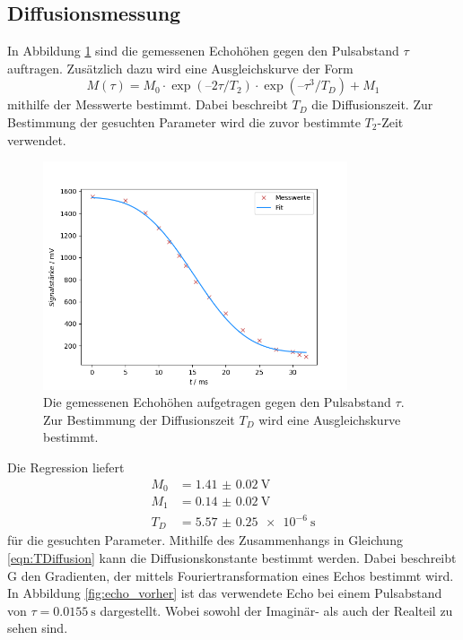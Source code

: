 \subsection{Diffusionsmessung}
In Abbildung \ref{fig:diff_fit} sind die gemessenen Echohöhen gegen den Pulsabstand $\tau$ auftragen.
Zusätzlich dazu wird eine Ausgleichskurve der Form
\begin{equation}
  M(\tau) = M_0 \cdot \exp(–2\tau/T_2)\cdot \exp(–\tau^3/T_D) + M_1 
\end{equation}
mithilfe der Messwerte bestimmt. Dabei beschreibt $T_D$ die Diffusionszeit. Zur Bestimmung der gesuchten Parameter wird 
die zuvor bestimmte $T_2$-Zeit verwendet.
\begin{figure}[H]
  \centering
  \includegraphics[width=0.8\textwidth]{../Auswertung/Diff_fit.png}
  \caption{Die gemessenen Echohöhen aufgetragen gegen den Pulsabstand $\tau$. Zur Bestimmung der Diffusionszeit $T_D$ wird eine
  Ausgleichskurve bestimmt.}
  \label{fig:diff_fit}
\end{figure} \noindent
Die Regression liefert
\begin{align}
  M_0 &= \SI{1.41(002)}{\volt} \\
  M_1 &= \SI{0.14(002)}{\volt} \\
  T_D &= \SI{5.57(025)e-6}{\second}
\end{align}
für die gesuchten Parameter.
Mithilfe des Zusammenhangs in Gleichung \ref{eqn:TDiffusion}
kann die Diffusionskonstante bestimmt werden. Dabei beschreibt G den Gradienten, der mittels Fouriertransformation eines Echos
bestimmt wird. In Abbildung \ref{fig:echo_vorher} ist das verwendete Echo bei einem Pulsabstand von $\tau = \SI{0.0155}{\second}$ dargestellt. Wobei sowohl der Imaginär- als auch der Realteil
zu sehen sind.
